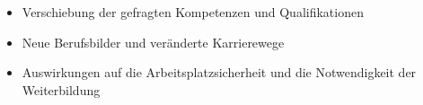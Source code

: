 \begin{itemize} 
    \item Verschiebung der gefragten Kompetenzen und Qualifikationen
    \item Neue Berufsbilder und veränderte Karrierewege
    \item Auswirkungen auf die Arbeitsplatzsicherheit und die Notwendigkeit der Weiterbildung
\end{itemize}